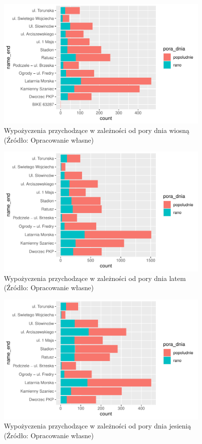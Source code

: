 \documentclass{amuthesis}
\begin{document}
\begin{figure}[t]

{\centering \includegraphics[width=400px]{figures/analiza9-1} 

}

\caption{Wypożyczenia przychodzące w zależności od pory dnia wiosną (Źródło: Opracowanie własne)}\label{fig:analiza9}
\end{figure}

\begin{figure}[t]

{\centering \includegraphics[width=400px]{figures/analiza10-1} 

}

\caption{Wypożyczenia przychodzące w zależności od pory dnia latem (Źródło: Opracowanie własne)}\label{fig:analiza10}
\end{figure}

\begin{figure}[t]

{\centering \includegraphics[width=400px]{figures/analiza11-1} 

}

\caption{Wypożyczenia przychodzące w zależności od pory dnia jesienią (Źródło: Opracowanie własne)}\label{fig:analiza11}
\end{figure}
\end{document}
